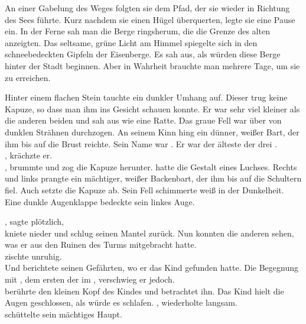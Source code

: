 \begin{Large}
An einer Gabelung des Weges folgten sie dem Pfad, der sie wieder in Richtung des Sees führte. Kurz nachdem sie einen Hügel überquerten, legte sie eine Pause ein. In der Ferne sah man die Berge ringsherum, die die Grenze des alten  anzeigten. Das seltsame, grüne Licht am Himmel spiegelte sich in den schneebedeckten Gipfeln der Eisenberge. Es sah aus, als würden diese Berge hinter der Stadt {\Tern} beginnen. Aber in Wahrheit brauchte man mehrere Tage, um sie zu erreichen.

Hinter einem flachen Stein tauchte ein dunkler Umhang auf. Dieser {\Schattenlaufer} trug keine Kapuze, so dass man ihm ins Gesicht schauen konnte. Er war sehr viel kleiner als die anderen beiden und sah aus wie eine Ratte. Das graue Fell war über von dunklen Strähnen durchzogen. An seinem Kinn hing ein dünner, weißer Bart, der ihm bis auf die Brust reichte. Sein Name war {\Dolo}. Er war der älteste der drei {\Schattenlaufer}.\\
, krächzte er.\\
, brummte {\Bomar} und zog die Kapuze herunter. 
{\Bomar} hatte die Gestalt eines Luchses. Rechts und links prangte ein mächtiger, weißer Backenbart, der ihm bis auf die Schultern fiel. Auch {\Eno} setzte die Kapuze ab. Sein Fell schimmerte weiß in der Dunkelheit. Eine dunkle Augenklappe bedeckte sein linkes Auge.

\q{{\Eno}}, sagte {\Dolo} plötzlich, \\
{\Eno} kniete nieder und schlug seinen Mantel zurück. Nun konnten die anderen sehen, was er aus den Ruinen des Turms mitgebracht hatte.\\
 zischte {\Bomar} unruhig. \\
Und {\Eno} berichtete seinen Gefährten, wo er das Kind gefunden hatte. Die Begegnung mit {\Pato}, dem ersten der {\Bangiri} im {\Enland}, verschwieg er jedoch.\\
{\Dolo} berührte den kleinen Kopf des Kindes und betrachtet ihn. Das Kind hielt die Augen geschlossen, als würde es schlafen. , wiederholte {\Dolo} langsam. \\
{\Bomar} schüttelte sein mächtiges Haupt. 


\end{Large}
